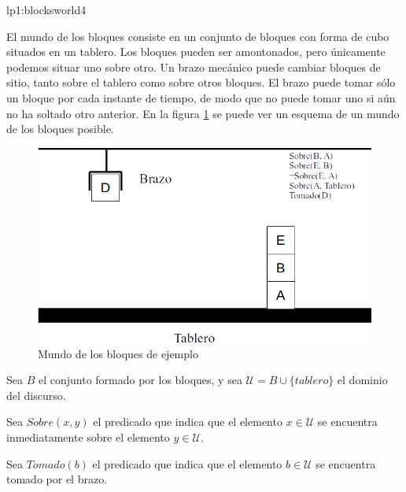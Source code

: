 \begin{defproblem}{lp1:blocksworld4}%
	\begin{onlyproblem}%
		El mundo de los bloques consiste en un conjunto de bloques con forma de cubo situados en un tablero. Los bloques pueden ser amontonados, pero únicamente podemos situar uno sobre otro. Un brazo mecánico puede cambiar bloques de sitio, tanto sobre el tablero como sobre otros bloques. El brazo puede tomar sólo un bloque por cada instante de tiempo, de modo que no puede tomar uno si aún no ha soltado otro anterior. En la figura \ref{fig:ejemplo-bloques4} se puede ver un esquema de un mundo de los bloques posible.
		
		\begin{figure}[b]
			\centering
			\includegraphics[width=0.7\linewidth]{Blocksworld-ejemplo}
			\caption[Mundo de los bloques de ejemplo]{Mundo de los bloques de ejemplo}
			\label{fig:ejemplo-bloques4}
		\end{figure}
		
		
		Sea $ B $ el conjunto formado por los bloques, y sea $ \mathcal{U} = B \cup \{tablero\} $ el dominio del discurso.
		
		Sea $ Sobre(x, y) $ el predicado que indica que el elemento $ x \in \mathcal{U} $ se encuentra inmediatamente sobre el elemento $ y \in \mathcal{U} $.
		
		Sea $ Tomado(b) $ el predicado que indica que el elemento $ b \in \mathcal{U} $ se encuentra tomado por el brazo.
		

\end{onlyproblem}
\end{defproblem}
